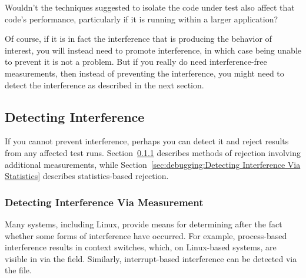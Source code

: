 \QuickQuiz{}
	Wouldn't the techniques suggested to isolate the code under
	test also affect that code's performance, particularly if
	it is running within a larger application?
 \QuickQuizEnd

Of course, if it is in fact the interference that is producing the
behavior of interest, you will instead need to promote interference,
in which case being unable to prevent it is not a problem.
But if you really do need interference-free measurements, then instead
of preventing the interference, you might need to detect the interference
as described in the next section.

\subsection{Detecting Interference}
\label{sec:debugging:Detecting Interference}

If you cannot prevent interference, perhaps you can detect it
and reject results from any affected test runs.
Section~\ref{sec:debugging:Detecting Interference Via Measurement}
describes methods of rejection involving additional measurements,
while Section~\ref{sec:debugging:Detecting Interference Via Statistics}
describes statistics-based rejection.

\subsubsection{Detecting Interference Via Measurement}
\label{sec:debugging:Detecting Interference Via Measurement}


Many systems, including Linux, provide means for determining after the
fact whether some forms of interference have occurred.
For example, process-based interference results in context switches,
which, on Linux-based systems, are visible in
 via the  field.
Similarly, interrupt-based interference can be detected via the
 file.

